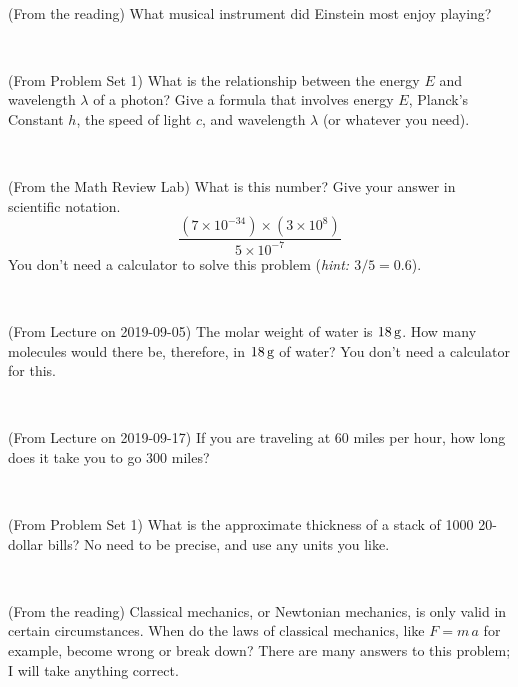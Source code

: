 \documentclass[12pt, letterpaper]{article}
\begin{document}
\vfill ~

\begin{problem} (From the reading)
What musical instrument did Einstein most enjoy playing?
\end{problem}


\vfill ~

\begin{problem} (From Problem Set 1)
What is the relationship between the energy $E$ and wavelength
$\lambda$ of a photon? Give a formula that involves energy $E$,
Planck's Constant $h$, the speed of light $c$, and wavelength
$\lambda$ (or whatever you need).
\end{problem}

\vfill ~

\begin{problem} (From the Math Review Lab)
What is this number? Give your answer in scientific notation.
$$
\frac{(7\times10^{-34})\times(3\times10^8)}{5\times10^{-7}}
$$
You don't need a calculator to solve this problem (\textit{hint: $3/5=0.6$}).
\end{problem}


\vfill ~


\clearpage


\begin{problem} (From Lecture on 2019-09-05)
The molar weight of water is $18\,\mathrm{g}$. How many molecules would there
be, therefore, in $18\,\mathrm{g}$ of water? You don't need a calculator for
this.
\end{problem}


\vfill ~

\begin{problem} (From Lecture on 2019-09-17)
If you are traveling at 60 miles per hour, how long does
it take you to go 300 miles?
\end{problem}


\vfill ~

\begin{problem} (From Problem Set 1)
What is the approximate thickness of a stack of 1000 20-dollar bills?
No need to be precise, and use any units you like.
\end{problem}


\vfill ~

\begin{problem} (From the reading)
Classical mechanics, or Newtonian mechanics, is only valid in certain
circumstances. When do the laws of classical mechanics, like $F =
m\,a$ for example, become wrong or break down? There are many answers
to this problem; I will take anything correct.
\end{problem}
\end{document}
